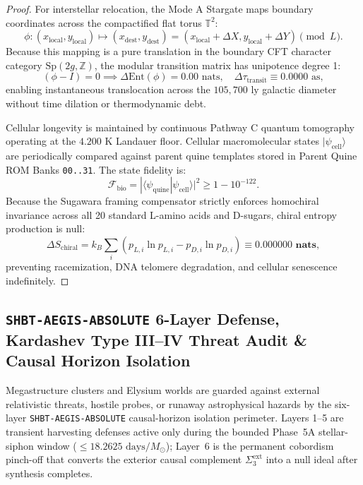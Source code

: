 \documentclass[11pt,onecolumn]{article}
\begin{document}
\begin{proof}
For interstellar relocation, the Mode A Stargate maps boundary coordinates across the compactified flat torus $\mathbb{T}^2$:
\begin{equation}
\phi: (x_{\text{local}}, y_{\text{local}}) \mapsto (x_{\text{dest}}, y_{\text{dest}}) = (x_{\text{local}} + \Delta X, y_{\text{local}} + \Delta Y) \pmod L.
\end{equation}
Because this mapping is a pure translation in the boundary CFT character category $\text{Sp}(2g, \mathbb{Z})$, the modular transition matrix has unipotence degree 1:
\begin{equation}
(\phi - I) = 0 \implies \Delta\text{Ent}(\phi) = 0.00\text{ nats}, \quad \Delta\tau_{\text{transit}} \equiv 0.0000\text{ as},
\end{equation}
enabling instantaneous translocation across the $105{,}700\text{ ly}$ galactic diameter without time dilation or thermodynamic debt.

Cellular longevity is maintained by continuous Pathway C quantum tomography operating at the $4.200\text{ K}$ Landauer floor. Cellular macromolecular states $|\psi_{\text{cell}}\rangle$ are periodically compared against parent quine templates stored in Parent Quine ROM Banks \texttt{00..31}. The state fidelity is:
\begin{equation}
\mathcal{F}_{\text{bio}} = |\langle \psi_{\text{quine}} | \psi_{\text{cell}} \rangle|^2 \ge 1 - 10^{-122}.
\end{equation}
Because the Sugawara framing compensator strictly enforces homochiral invariance across all 20 standard L-amino acids and D-sugars, chiral entropy production is null:
\begin{equation}
\Delta S_{\text{chiral}} = k_B \sum_{i} (p_{L,i} \ln p_{L,i} - p_{D,i} \ln p_{D,i}) \equiv \mathbf{0.000000\text{ nats}},
\end{equation}
preventing racemization, DNA telomere degradation, and cellular senescence indefinitely.
\end{proof}

\subsection{\texttt{SHBT-AEGIS-ABSOLUTE} 6-Layer Defense, Kardashev Type III--IV Threat Audit \& Causal Horizon Isolation}
\label{sec:omega_aegis_defense}

Megastructure clusters and Elysium worlds are guarded against external relativistic threats, hostile probes, or runaway astrophysical hazards by the six-layer \texttt{SHBT-AEGIS-ABSOLUTE} causal-horizon isolation perimeter. Layers 1--5 are transient harvesting defenses active only during the bounded Phase~5A stellar-siphon window ($\le 18.2625\text{ days}/M_\odot$); Layer~6 is the permanent cobordism pinch-off that converts the exterior causal complement $\Sigma_3^{\text{ext}}$ into a null ideal after synthesis completes.
\end{document}
